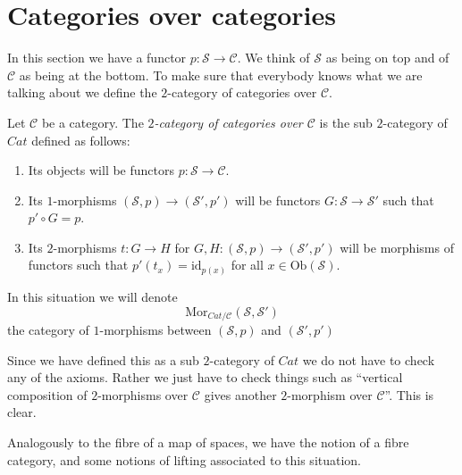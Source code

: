 \section{Categories over categories}
\label{section-categories-over-categories}

\noindent
In this section we have a functor $p : \mathcal{S} \to \mathcal{C}$.
We think of $\mathcal{S}$ as being on top and of $\mathcal{C}$ as being
at the bottom. To make sure that everybody knows what we are talking about
we define the $2$-category of categories over $\mathcal{C}$.

\begin{definition}
\label{definition-categories-over-C}
Let $\mathcal{C}$ be a category.
The {\it $2$-category of categories over $\mathcal{C}$}
is the sub $2$-category of $\textit{Cat}$ defined as follows:
\begin{enumerate}
\item Its objects will be functors $p : \mathcal{S} \to \mathcal{C}$.
\item Its $1$-morphisms $(\mathcal{S}, p) \to (\mathcal{S}', p')$
will be functors $G : \mathcal{S} \to \mathcal{S}'$ such that
$p' \circ G = p$.
\item Its $2$-morphisms $t : G \to H$ for
$G, H : (\mathcal{S}, p) \to (\mathcal{S}', p')$
will be morphisms of functors
such that $p'(t_x) = \text{id}_{p(x)}$
for all $x \in \text{Ob}(\mathcal{S})$.
\end{enumerate}
In this situation we will denote
$$
\text{Mor}_{\textit{Cat}/\mathcal{C}}(\mathcal{S}, \mathcal{S}')
$$
the category of $1$-morphisms between
$(\mathcal{S}, p)$ and $(\mathcal{S}', p')$
\end{definition}

\noindent
Since we have defined this as a sub $2$-category of $\textit{Cat}$
we do not have to check any of the axioms. Rather we just have to check
things such as ``vertical composition of $2$-morphisms over $\mathcal{C}$
gives another $2$-morphism over $\mathcal{C}$''. This is clear.

\medskip\noindent
Analogously to the fibre of a map of spaces, we have the notion of a
fibre category, and some notions of lifting associated to this
situation.

